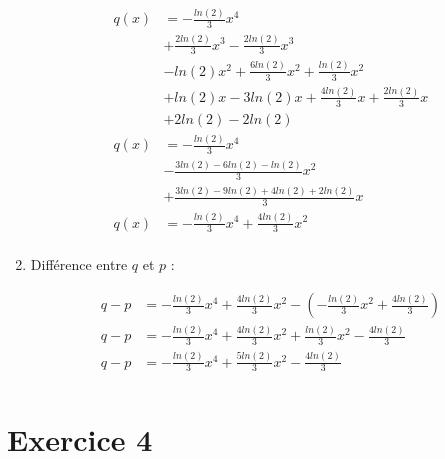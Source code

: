 \documentclass[12pt, letterpaper]{article}
\begin{document}
\begin{enumerate}
  \begin{equation*}
    \begin{split}
      q(x) & = - \frac{ln(2)}{3}x^4 \\
      & + \frac{2ln(2)}{3}x^3 - \frac{2ln(2)}{3}x^3 \\
      & - ln(2)x^2 + \frac{6ln(2)}{3}x^2 + \frac{ln(2)}{3}x^2 \\
      & + ln(2)x - 3ln(2)x + \frac{4ln(2)}{3}x + \frac{2ln(2)}{3}x  \\
      & + 2ln(2) - 2ln(2) \\
      q(x) & = - \frac{ln(2)}{3}x^4 \\
      & - \frac{3ln(2) - 6ln(2) - ln(2)}{3}x^2 \\
      & + \frac{3ln(2) - 9ln(2) + 4ln(2) + 2ln(2)}{3}x  \\
      q(x) & = - \frac{ln(2)}{3}x^4 + \frac{4ln(2)}{3}x^2 \\
    \end{split}
  \end{equation*}

\item Différence entre $q$ et $p$ :

  \begin{equation*}
    \begin{split}
      q - p & = - \frac{ln(2)}{3}x^4 + \frac{4ln(2)}{3}x^2 - (- \frac{
        ln(2)}{3}x^2 + \frac{4ln(2)}{3}) \\
      q - p & = - \frac{ln(2)}{3}x^4 + \frac{4ln(2)}{3}x^2 + \frac{
        ln(2)}{3}x^2 - \frac{4ln(2)}{3} \\
      q - p & = - \frac{ln(2)}{3}x^4 + \frac{5ln(2)}{3}x^2 - \frac{4ln(2)}{3} \\
    \end{split}
  \end{equation*}
  
\end{enumerate}

\section*{Exercice 4}
\end{document}
